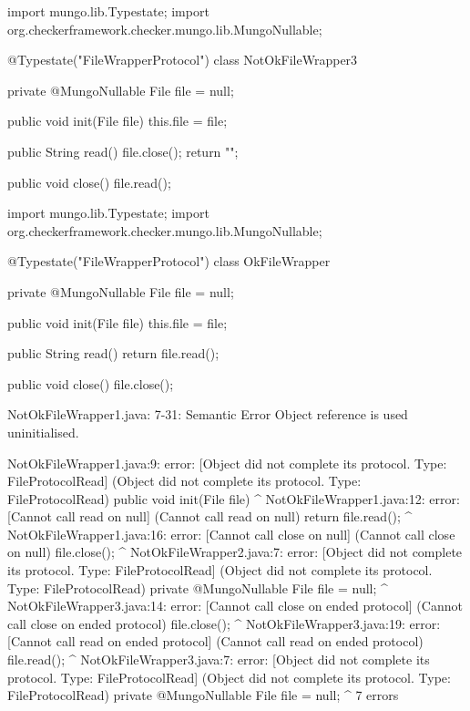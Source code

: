 \begin{code}
import mungo.lib.Typestate;
import org.checkerframework.checker.mungo.lib.MungoNullable;

@Typestate("FileWrapperProtocol")
class NotOkFileWrapper3 {

  private @MungoNullable File file = null;

  public void init(File file) {
    this.file = file;
  }

  public String read() {
    file.close();
    return "";
  }

  public void close() {
    file.read();
  }

}\end{code}

\begin{code}
import mungo.lib.Typestate;
import org.checkerframework.checker.mungo.lib.MungoNullable;

@Typestate("FileWrapperProtocol")
class OkFileWrapper {

  private @MungoNullable File file = null;

  public void init(File file) {
    this.file = file;
  }

  public String read() {
    return file.read();
  }

  public void close() {
    file.close();
  }

}\end{code}

\lstset{language=,caption=Original Mungo output}
\begin{code}

NotOkFileWrapper1.java: 7-31: Semantic Error
		Object reference is used uninitialised.
\end{code}

\lstset{language=,caption=New Mungo output}
\begin{code}
NotOkFileWrapper1.java:9: error: [Object did not complete its protocol. Type: FileProtocol{Read}] (Object did not complete its protocol. Type: FileProtocol{Read})
  public void init(File file) {}
                        ^
NotOkFileWrapper1.java:12: error: [Cannot call read on null] (Cannot call read on null)
    return file.read();
                    ^
NotOkFileWrapper1.java:16: error: [Cannot call close on null] (Cannot call close on null)
    file.close();
              ^
NotOkFileWrapper2.java:7: error: [Object did not complete its protocol. Type: FileProtocol{Read}] (Object did not complete its protocol. Type: FileProtocol{Read})
  private @MungoNullable File file = null;
                              ^
NotOkFileWrapper3.java:14: error: [Cannot call close on ended protocol] (Cannot call close on ended protocol)
    file.close();
              ^
NotOkFileWrapper3.java:19: error: [Cannot call read on ended protocol] (Cannot call read on ended protocol)
    file.read();
             ^
NotOkFileWrapper3.java:7: error: [Object did not complete its protocol. Type: FileProtocol{Read}] (Object did not complete its protocol. Type: FileProtocol{Read})
  private @MungoNullable File file = null;
                              ^
7 errors
\end{code}

